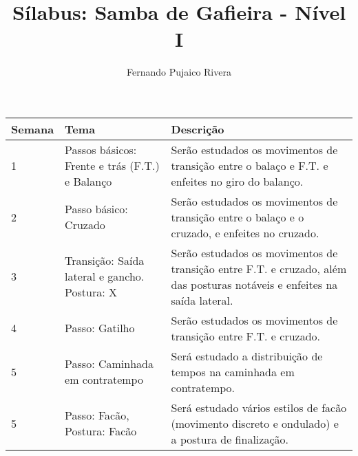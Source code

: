 \documentclass[a4paper,10pt]{article}
\title{Sílabus: Samba de Gafieira - Nível I}
\author{Fernando Pujaico Rivera}
\begin{document}
\maketitle

\begin{table}[]
\begin{tabular}{|l|p{4cm}|p{6cm}|}
\hline
Semana & Tema & Descrição \\  \hline
1 &  Passos básicos: Frente e trás (F.T.) e Balanço & Serão estudados os movimentos de transição entre o balaço e F.T. e enfeites no giro do balanço.\\ \hline
2 &  Passo básico: Cruzado &  Serão estudados os movimentos de transição entre o balaço e o cruzado, e enfeites no cruzado. \\ \hline
3 &  Transição: Saída lateral e gancho. Postura: X &  Serão estudados os movimentos de transição entre F.T. e cruzado, além das posturas notáveis e enfeites na saída lateral.\\ \hline
4 &  Passo: Gatilho &  Serão estudados os movimentos de transição entre F.T. e cruzado. \\ \hline
5 &  Passo: Caminhada em contratempo & Será estudado a distribuição de tempos na caminhada em contratempo. \\ \hline
5 &  Passo: Facão, Postura: Facão & Será estudado vários estilos de facão (movimento discreto e ondulado) e a postura de finalização. \\ \hline
\end{tabular}
\end{table}
\end{document}
